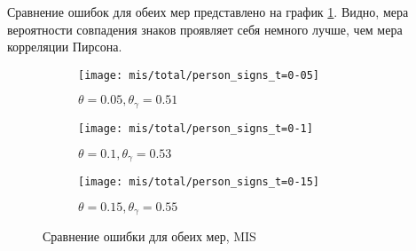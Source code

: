 Сравнение ошибок для обеих мер представлено на график \ref{fig:exp/mis/pearson_signs}. Видно, мера вероятности совпадения знаков проявляет себя немного лучше, чем мера корреляции Пирсона.

\begin{figure}[H]
     \centering
     \begin{subfigure}[b]{0.49\textwidth}
         \centering
         \texttt{[image: mis/total/person\_signs\_t=0-05]}
         \caption{$\theta=0.05, \theta_\gamma=0.51$}
     \end{subfigure}
     \hfill
     \begin{subfigure}[b]{0.49\textwidth}
         \centering
         \texttt{[image: mis/total/person\_signs\_t=0-1]}
         \caption{$\theta=0.1, \theta_\gamma=0.53$}
     \end{subfigure}
     \vfill
     \begin{subfigure}[b]{0.49\textwidth}
         \centering
         \texttt{[image: mis/total/person\_signs\_t=0-15]}
         \caption{$\theta=0.15, \theta_\gamma=0.55$}
     \end{subfigure}

    
        \caption{Сравнение ошибки для обеих мер,  MIS}
        \label{fig:exp/mis/pearson_signs}
\end{figure}  

